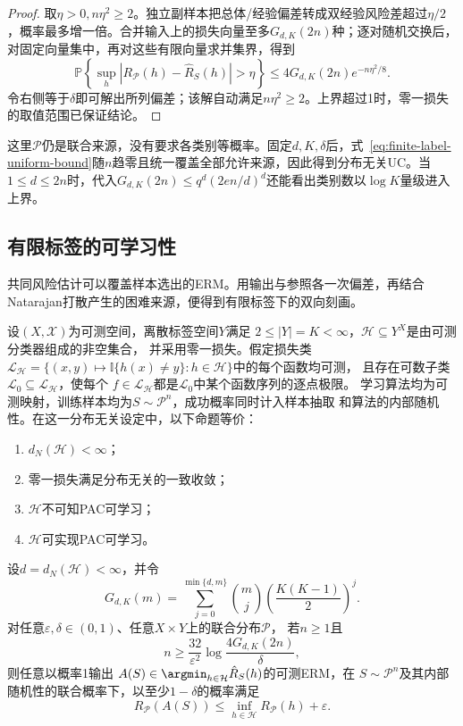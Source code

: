 \begin{proof}
取$\eta>0,n\eta^2\geq2$。独立副样本把总体/经验偏差转成双经验风险差超过$\eta/2$，概率最多增一倍。合并输入上的损失向量至多$G_{d,K}(2n)$种；逐对随机交换后，对固定向量集中，再对这些有限向量求并集界，得到
\[
 \mathbb P\!\left\{\sup_h|R_{\mathcal P}(h)-\hat R_S(h)|>\eta\right\}
 \leq4G_{d,K}(2n)e^{-n\eta^2/8}.
\]
令右侧等于$\delta$即可解出所列偏差；该解自动满足$n\eta^2\geq2$。上界超过1时，零一损失的取值范围已保证结论。
\end{proof}

这里$\mathcal P$仍是联合来源，没有要求各类别等概率。固定$d,K,\delta$后，式~\eqref{eq:finite-label-uniform-bound}随$n$趋零且统一覆盖全部允许来源，因此得到分布无关UC。当$1\leq d\leq2n$时，代入$G_{d,K}(2n)\leq q^d(2en/d)^d$还能看出类别数以$\log K$量级进入上界。

\subsection{有限标签的可学习性}

共同风险估计可以覆盖样本选出的ERM。用输出与参照各一次偏差，再结合Natarajan打散产生的困难来源，便得到有限标签下的双向刻画。

\begin{theorem}[有限标签的可学习性刻画]
\label{thm:finite-label-learnability}
设$(X,\mathcal X)$为可测空间，离散标签空间$Y$满足
$2\leq|Y|=K<\infty$，$\mathcal H\subseteq Y^X$是由可测分类器组成的非空集合，
并采用零一损失。假定损失类
$\mathcal L_{\mathcal H}
=\{(x,y)\mapsto\mathbb I\{h(x)\neq y\}:h\in\mathcal H\}$中的每个函数均可测，
且存在可数子类$\mathcal L_0\subseteq\mathcal L_{\mathcal H}$，使每个
$f\in\mathcal L_{\mathcal H}$都是$\mathcal L_0$中某个函数序列的逐点极限。
学习算法均为可测映射，训练样本均为$S\sim\mathcal P^n$，成功概率同时计入样本抽取
和算法的内部随机性。在这一分布无关设定中，以下命题等价：
\begin{enumerate}
 \item $d_N(\mathcal H)<\infty$；
 \item 零一损失满足分布无关的一致收敛；
 \item $\mathcal H$不可知PAC可学习；
 \item $\mathcal H$可实现PAC可学习。
\end{enumerate}

设$d=d_N(\mathcal H)<\infty$，并令
\[
 G_{d,K}(m)=\sum_{j=0}^{\min\{d,m\}}\binom mj
 \left(\frac{K(K-1)}2\right)^j.
\]
对任意$\varepsilon,\delta\in(0,1)$、任意$X\times Y$上的联合分布$\mathcal P$，
若$n\geq1$且
\[
 n\geq\frac{32}{\varepsilon^2}\log\frac{4G_{d,K}(2n)}{\delta},
\]
则任意以概率1输出
$A(S)\in\argmin_{h\in\mathcal H}\hat R_S(h)$的可测ERM，在
$S\sim\mathcal P^n$及其内部随机性的联合概率下，以至少$1-\delta$的概率满足
\[
 R_{\mathcal P}(A(S))\leq\inf_{h\in\mathcal H}R_{\mathcal P}(h)+\varepsilon.
\]
\end{theorem}

